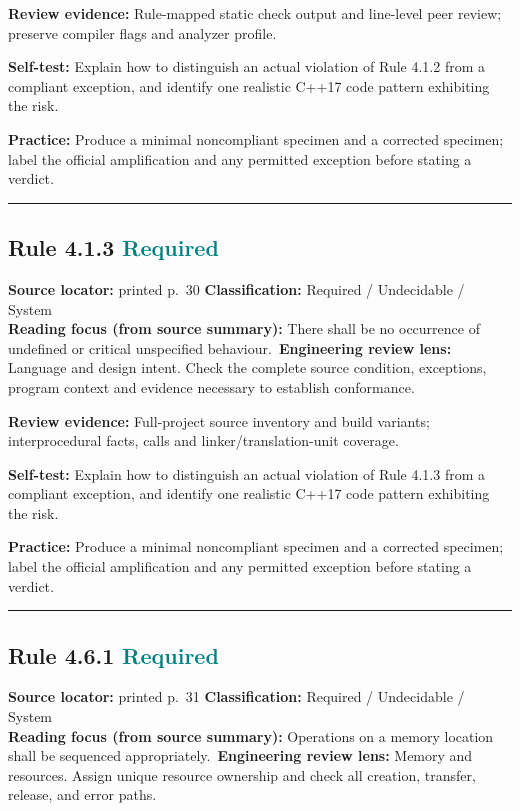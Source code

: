\documentclass[10pt,letterpaper]{article}
\begin{document}
\textbf{Review evidence:} Rule-mapped static check output and line-level peer review; preserve compiler flags and analyzer profile.

\textbf{Self-test:} Explain how to distinguish an actual violation of Rule 4.1.2 from a compliant exception, and identify one realistic C++17 code pattern exhibiting the risk.\par
\textbf{Practice:} Produce a minimal noncompliant specimen and a corrected specimen; label the official amplification and any permitted exception before stating a verdict.
\smallskip\hrule\smallskip
\subsection*{Rule 4.1.3 \enspace \texorpdfstring{\small\textcolor{teal}{Required}}{Required}}
\noindent\textbf{Source locator:} printed p.~30 \quad\textbf{Classification:} Required / Undecidable / System\\
\textbf{Reading focus (from source summary):} There shall be no occurrence of undefined or critical unspecified behaviour.\
\textbf{Engineering review lens:} Language and design intent. Check the complete source condition, exceptions, program context and evidence necessary to establish conformance.

\textbf{Review evidence:} Full-project source inventory and build variants; interprocedural facts, calls and linker/translation-unit coverage.

\textbf{Self-test:} Explain how to distinguish an actual violation of Rule 4.1.3 from a compliant exception, and identify one realistic C++17 code pattern exhibiting the risk.\par
\textbf{Practice:} Produce a minimal noncompliant specimen and a corrected specimen; label the official amplification and any permitted exception before stating a verdict.
\smallskip\hrule\smallskip
\subsection*{Rule 4.6.1 \enspace \texorpdfstring{\small\textcolor{teal}{Required}}{Required}}
\noindent\textbf{Source locator:} printed p.~31 \quad\textbf{Classification:} Required / Undecidable / System\\
\textbf{Reading focus (from source summary):} Operations on a memory location shall be sequenced appropriately.\
\textbf{Engineering review lens:} Memory and resources. Assign unique resource ownership and check all creation, transfer, release, and error paths.
\end{document}
